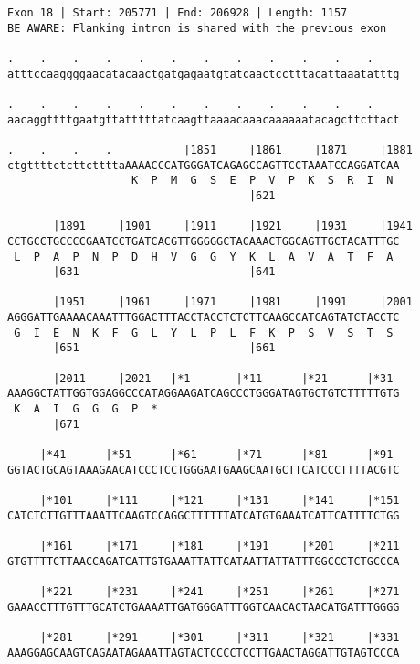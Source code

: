 \documentclass{article}
\begin{document}
\begin{Verbatim}[fontfamily=courier]
Exon 18 | Start: 205771 | End: 206928 | Length: 1157
BE AWARE: Flanking intron is shared with the previous exon

.    .    .    .    .    .    .    .    .    .    .    .    
atttccaaggggaacatacaactgatgagaatgtatcaactcctttacattaaatatttg

.    .    .    .    .    .    .    .    .    .    .    .    
aacaggttttgaatgttatttttatcaagttaaaacaaacaaaaaatacagcttcttact

.    .    .    .           |1851     |1861     |1871     |1881
ctgttttctcttcttttaAAAACCCATGGGATCAGAGCCAGTTCCTAAATCCAGGATCAA
                   K  P  M  G  S  E  P  V  P  K  S  R  I  N 
                                     |621                   

       |1891     |1901     |1911     |1921     |1931     |1941
CCTGCCTGCCCCGAATCCTGATCACGTTGGGGGCTACAAACTGGCAGTTGCTACATTTGC
 L  P  A  P  N  P  D  H  V  G  G  Y  K  L  A  V  A  T  F  A 
       |631                          |641                   

       |1951     |1961     |1971     |1981     |1991     |2001
AGGGATTGAAAACAAATTTGGACTTTACCTACCTCTCTTCAAGCCATCAGTATCTACCTC
 G  I  E  N  K  F  G  L  Y  L  P  L  F  K  P  S  V  S  T  S 
       |651                          |661                   

       |2011     |2021   |*1       |*11      |*21      |*31 
AAAGGCTATTGGTGGAGGCCCATAGGAAGATCAGCCCTGGGATAGTGCTGTCTTTTTGTG
 K  A  I  G  G  G  P  *   
       |671                                                 

     |*41      |*51      |*61      |*71      |*81      |*91 
GGTACTGCAGTAAAGAACATCCCTCCTGGGAATGAAGCAATGCTTCATCCCTTTTACGTC

     |*101     |*111     |*121     |*131     |*141     |*151
CATCTCTTGTTTAAATTCAAGTCCAGGCTTTTTTATCATGTGAAATCATTCATTTTCTGG

     |*161     |*171     |*181     |*191     |*201     |*211
GTGTTTTCTTAACCAGATCATTGTGAAATTATTCATAATTATTATTTGGCCCTCTGCCCA

     |*221     |*231     |*241     |*251     |*261     |*271
GAAACCTTTGTTTGCATCTGAAAATTGATGGGATTTGGTCAACACTAACATGATTTGGGG

     |*281     |*291     |*301     |*311     |*321     |*331
AAAGGAGCAAGTCAGAATAGAAATTAGTACTCCCCTCCTTGAACTAGGATTGTAGTCCCA

\end{Verbatim}
\newpage
\end{document}

